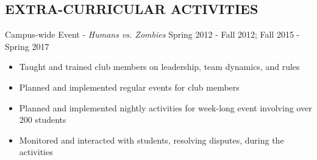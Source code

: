 \documentclass[10pt, resumewidth=7in]{res} %
\begin{document}
\begin{resume}
%


\section{EXTRA-CURRICULAR ACTIVITIES}

Campus-wide Event - {\sl Humans vs. Zombies} \hfill Spring 2012 - Fall 2012; Fall 2015 - Spring 2017
\begin{itemize} \itemsep -2pt
  \item Taught and trained club members on leadership, team dynamics, and rules
  \item Planned and implemented regular events for club members
  \item Planned and implemented nightly activities for week-long event involving over 200 students
  \item Monitored and interacted with students, resolving disputes, during the activities
\end{itemize}

%
%



\end{resume}
\end{document}

